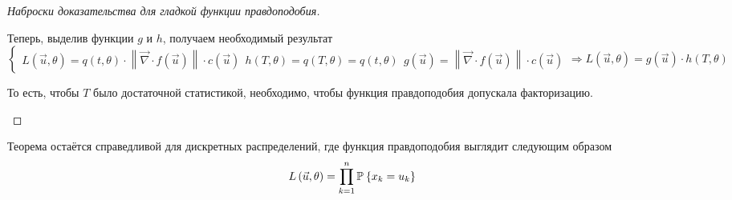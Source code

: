 \begin{proof}[Наброски доказательства для гладкой функции правдоподобия]
\begin{enumerate}
      Теперь, выделив функции $g$ и $h$, получаем необходимый результат
      $$\begin{cases}
      L\left( \vec{u}, \theta \right)
    = q\left( t, \theta \right)
        \cdot \left\| \vec{\nabla}
    \cdot f\left( \vec{u} \right) \right\|
    \cdot c\left( \vec{u} \right) \ \
      h\left( T, \theta \right)
    = q\left( T, \theta \right)
    = q\left( t, \theta \right) \ \
      g\left( \vec{u} \right)
    = \left\| \vec{\nabla}
    \cdot f\left( \vec{u} \right) \right\|
        \cdot c\left( \vec{u} \right)
      \end{cases}
      \Rightarrow
      L\left( \vec{u}, \theta \right)
    = g\left( \vec{u} \right) \cdot h\left( T, \theta \right)$$

     То есть, чтобы $T$ было достаточной статистикой, необходимо, чтобы
     функция правдоподобия допускала факторизацию.
  \end{enumerate}
\end{proof}

\begin{remark}
  Теорема остаётся справедливой для дискретных распределений,
  где функция правдоподобия выглядит следующим образом
  $$L\left( \vec{u}, \theta \right) = \prod_{k=1}^n \mathbb{P}_{{}}\left\{ x_k = u_k \right\}$$
\end{remark}

